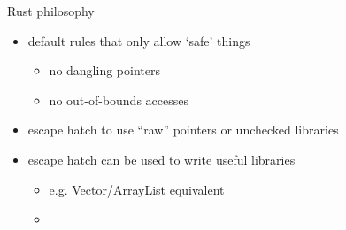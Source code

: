 
\begin{frame}{Rust philosophy}
    \begin{itemize}
    \item default rules that only allow `safe' things
        \begin{itemize}
        \item no dangling pointers
        \item no out-of-bounds accesses
        \end{itemize}
    \item escape hatch to use ``raw'' pointers or unchecked libraries
    \item escape hatch can be used to write useful libraries
        \begin{itemize}
            \item e.g. Vector/ArrayList equivalent
            \item {}
        \end{itemize}
    \end{itemize}
\end{frame}

